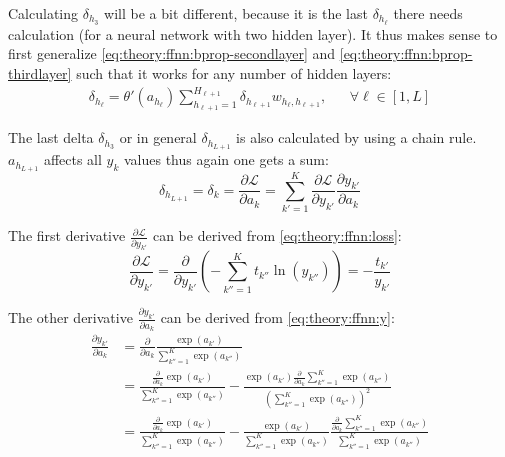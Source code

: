 Calculating $\delta_{h_3}$ will be a bit different, because it is the last $\delta_{h_\ell}$ there needs calculation (for a neural network with two hidden layer). It thus makes sense to first generalize \eqref{eq:theory:ffnn:bprop-secondlayer} and \eqref{eq:theory:ffnn:bprop-thirdlayer} such that it works for any number of hidden layers:
\begin{equation}
\begin{aligned}
\delta_{h_\ell} = \theta'(a_{h_\ell}) \sum_{h_{\ell+1}=1}^{H_{\ell+1}} \delta_{h_{\ell+1}} w_{h_\ell, h_{\ell+1}}, && \forall \ell \in [1, L]
\end{aligned}
\label{eq:theory:ffnn:bprop-genalized}
\end{equation}

The last delta $\delta_{h_3}$ or in general $\delta_{h_{L+1}}$ is also calculated by using a chain rule. $a_{h_{L+1}}$ affects all $y_k$ values thus again one gets a sum:
\begin{equation}
\delta_{h_{L + 1}} = \delta_k = \frac{\partial \mathcal{L}}{\partial a_k} = \sum_{k'=1}^K \frac{\partial \mathcal{L}}{\partial y_{k'}} \frac{\partial y_{k'}}{\partial a_k}
\label{eq:theory:ffnn:bprop-deltaK}
\end{equation}

The first derivative $\frac{\partial \mathcal{L}}{\partial y_{k'}}$ can be derived from \eqref{eq:theory:ffnn:loss}:
\begin{equation}
\frac{\partial \mathcal{L}}{\partial y_{k'}} = \frac{\partial}{\partial y_{k'}} \left(- \sum_{k''=1}^K t_{k''} \ln(y_{k''})\right) = -\frac{t_{k'}}{y_{k'}}
\label{eq:theory:ffnn:bprop-Ldy}
\end{equation}

The other derivative $\frac{\partial y_{k'}}{\partial a_k}$ can be derived from \eqref{eq:theory:ffnn:y}:
\begin{equation}
\begin{aligned}
\frac{\partial y_{k'}}{\partial a_k}
&= \frac{\partial}{\partial a_k} \frac{\exp(a_{k'})}{\sum_{k''=1}^K \exp(a_{k''})} \\
&= \frac{\frac{\partial}{\partial a_k} \exp(a_{k'})}{\sum_{k''=1}^K \exp(a_{k''})}
- \frac{\exp(a_{k'}) \frac{\partial}{\partial a_k} \sum_{k''=1}^K \exp(a_{k''})}{\left(\sum_{k''=1}^K \exp(a_{k''})\right)^2} \\
&= \frac{\frac{\partial}{\partial a_k} \exp(a_{k'})}{\sum_{k''=1}^K \exp(a_{k''})}
- \frac{\exp(a_{k'})}{\sum_{k''=1}^K \exp(a_{k''})} \frac{\frac{\partial}{\partial a_k} \sum_{k''=1}^K \exp(a_{k''})}{\sum_{k''=1}^K \exp(a_{k''})}
\end{aligned}
\end{equation}


